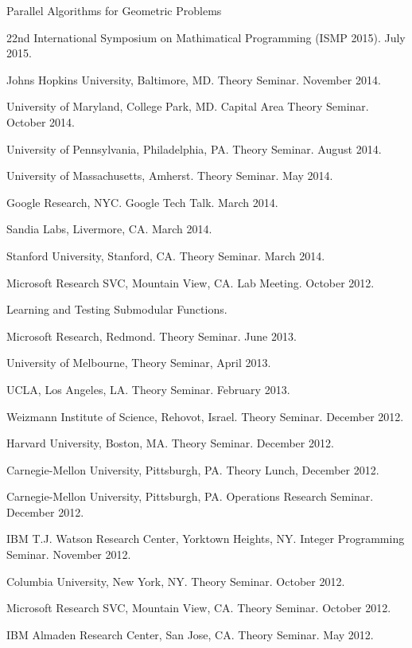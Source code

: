 \documentclass[11pt]{article}
\newenvironment{innerlist}[1][\enskip\textbullet]%
        {\begin{compactitem}[#1]}{\end{compactitem}}
\begin{document}
\begin{innerlist}
\item Parallel Algorithms for Geometric Problems
\begin{innerlist}
\item 22nd International Symposium on Mathimatical Programming (ISMP 2015). July 2015.
\item Johns Hopkins University, Baltimore, MD. Theory Seminar. November 2014.
\item University of Maryland, College Park, MD. Capital Area Theory Seminar. October 2014.
\item University of Pennsylvania, Philadelphia, PA. Theory Seminar. August 2014.
\item University of Massachusetts, Amherst. Theory Seminar. May 2014.
\item Google Research, NYC. Google Tech Talk. March 2014.
\item Sandia Labs, Livermore, CA. March 2014.
\item Stanford University, Stanford, CA. Theory Seminar. March 2014.
\item Microsoft Research SVC, Mountain View, CA. Lab Meeting. October 2012.
\end{innerlist}

\item Learning and Testing Submodular Functions.
\begin{innerlist}
  \item Microsoft Research, Redmond. Theory Seminar. June 2013.
  \item University of Melbourne, Theory Seminar, April 2013.
  \item UCLA, Los Angeles, LA. Theory Seminar. February 2013.
  \item Weizmann Institute of Science, Rehovot, Israel. Theory Seminar. December 2012.  
  \item Harvard University, Boston, MA. Theory Seminar. December 2012.
  \item Carnegie-Mellon University, Pittsburgh, PA. Theory Lunch, December 2012.
  \item Carnegie-Mellon University, Pittsburgh, PA. Operations Research Seminar. December 2012.
  \item IBM T.J. Watson Research Center, Yorktown Heights, NY. Integer Programming Seminar. November 2012.
  \item Columbia University, New York, NY. Theory Seminar. October 2012.
  \item Microsoft Research SVC, Mountain View, CA. Theory Seminar. October 2012.
  \item IBM Almaden Research Center, San Jose, CA. Theory Seminar. May 2012.
\end{innerlist}


\end{innerlist}
\end{document}
